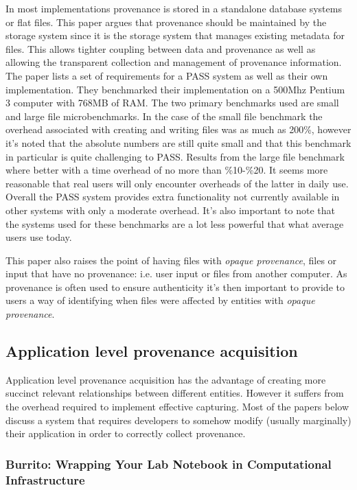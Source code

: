 In most implementations provenance is stored in a standalone database systems or flat files. This paper argues that provenance should be maintained by the storage system since it is the storage system that manages existing metadata for files. This allows tighter coupling between data and provenance as well as allowing the transparent collection and management of provenance information. The paper lists a set of requirements for a PASS system as well as their own implementation. They benchmarked their implementation on a 500Mhz Pentium 3 computer with 768MB of RAM. The two primary benchmarks used are small and large file microbenchmarks. In the case of the small file benchmark the overhead associated with creating and writing files was as much as 200\%, however it's noted that the absolute numbers are still quite small and that this benchmark in particular is quite challenging to PASS. Results from the large file benchmark where better with a time overhead of no more than \%10-\%20.  It seems more reasonable that real users will only encounter overheads of the latter in daily use. Overall the PASS system provides extra functionality not currently available in other systems with only a moderate overhead. It's also important to note that the systems used for these benchmarks are a lot less powerful that what average users use today.

This paper also raises the point of having files with \textit{opaque provenance}, files or input that have no provenance: i.e. user input or files from another computer. As provenance is often used to ensure authenticity it's then important to provide to users a way of identifying when files were affected by entities with \textit{opaque provenance}.

\subsection{Application level provenance acquisition}
\label{sub:application_level_provenance_acquisition}

Application level provenance acquisition has the advantage of creating more succinct relevant relationships between different entities. However it suffers from the overhead required to implement effective capturing. Most of the papers below discuss a system that requires developers to somehow modify (usually marginally) their application in order to correctly collect provenance.

\subsubsection{Burrito: Wrapping Your Lab Notebook in Computational Infrastructure\cite{Guo2012}}
\label{sub:burrito_wrapping_your_lab_notebook_in_computational_infrastructureguo2012}

